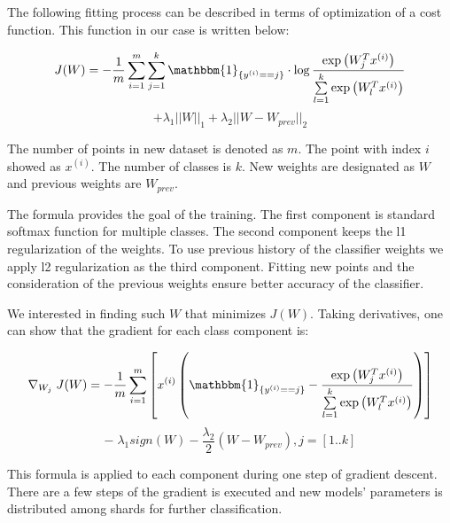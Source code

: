 The following fitting process can be described in terms of optimization of a cost function. This function in our case is written below:

\begin{center}

$$ J(W) = -\frac{1}{m} \sum \limits_{i = 1}^{m} \sum \limits_{j = 1}^{k} \mathbbm{1}_{\{y^{(i)} == j\}} \cdot \log \frac{\exp\left({W_{j}^Tx^{(i)}}\right) }{\sum \limits_{l = 1}^{k}  \exp\left({W_{l}^Tx^{(i)}}\right) }$$ 
 $$ +  \lambda_1 ||W||_1 + \lambda_2 ||W - W_{prev}||_2 $$

\end{center} 

The number of points in new dataset is denoted as $m$. The point with index $i$ showed as $x^{(i)}$. The number of classes is $k$. New weights are designated as $W$ and previous weights are $W_{prev}$.

The formula provides the goal of the training. The first component is standard softmax function for multiple classes. The second component keeps the l1 regularization of the weights. To use previous history of the classifier weights we apply l2 regularization as the third component. Fitting new points and the consideration of the previous weights ensure better accuracy of the classifier.

We interested in finding such $W$ that minimizes $J(W)$. Taking derivatives, one can show that the gradient for each class component is:

\begin{center}

$$ \nabla_{W_j} \; J(W) = -\frac{1}{m} \sum \limits_{i = 1}^{m} \left[ x^{(i)} \left( \mathbbm{1}_{\{y^{(i)} == j\} } - \frac{\exp\left({W_{j}^Tx^{(i)}}\right)}{\sum \limits_{l = 1}^{k}  \exp\left({W_{l}^Tx^{(i)}}\right)} \right) \right] $$
$$ - \; \lambda_1 sign(W) - \frac{\lambda_2}{2} \left(W - W_{prev} \right), j = [1..k] $$

\end{center} 

This formula is applied to each component during one step of gradient descent. There are a few steps of the gradient is executed and new models' parameters is distributed among shards for further classification.